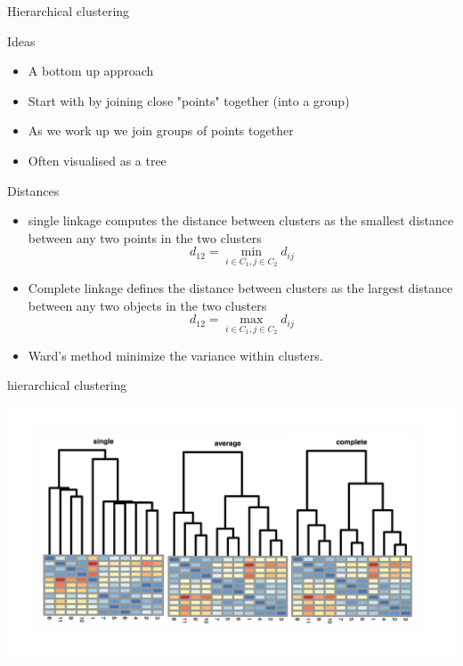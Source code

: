 \documentclass{bredelebeamer}
\begin{document}
\begin{frame}{Hierarchical clustering}
\begin{block}{Ideas}
	
\begin{itemize}
\item A bottom up approach
\item Start with by joining close "points" together (into a group)
\item As we work up we join groups of points together
\item Often visualised as a tree
\end{itemize}
\end{block}

\begin{exampleblock}{Distances}
	
	\begin{itemize}
\item single linkage computes the distance between clusters as the smallest distance between any two points in the two clusters
\begin{equation}
d_{12} = \min_{i \in C_1, j \in C_2} d_{ij}
\end{equation}
\item Complete linkage defines the distance between clusters as the largest distance between any two objects in the two clusters
\begin{equation}
d_{12} = \max_{i \in C_1, j \in C_2} d_{ij}
\end{equation}
\item Ward’s method minimize the variance within clusters.
\end{itemize}
\end{exampleblock}

\end{frame}



\begin{frame}{hierarchical clustering}

\includegraphics[width = 1\textwidth]{hclust}

\end{frame}
\end{document}
